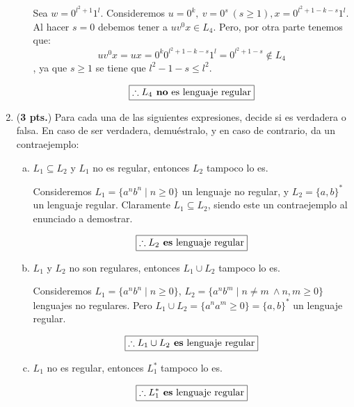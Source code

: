 \documentclass{article}
\begin{document}
\begin{enumerate}
\begin{enumerate}[a)]
          Sea $w = 0^{l^2 + 1}1^l$. Consideremos $u = 0^k,~ v = 0^s ~ (s \ge 1), x = 0^{l^2+1 - k - s}1^l$. Al hacer $s = 0$ debemos tener a $uv^0x \in L_4$. Pero, por otra parte tenemos que:
          $$uv^0x = ux = 0^k0^{l^2 + 1 - k - s}1^l = 0^{l^2 + 1 - s} \notin L_4$$,
          ya que $s \ge 1$ se tiene que $l^2 - 1 - s \le l^2$.

          $$\boxed{\therefore L_4 \text{\textbf{ no} es lenguaje regular}}$$

      \end{enumerate}

    \item (\textbf{3 pts.}) Para cada una de las siguientes expresiones, decide si es verdadera o falsa. En caso de ser verdadera, demuéstralo, y en caso de contrario, da un contraejemplo:
      \begin{enumerate}[a)]
        \item $L_1 \subseteq L_2$ y $L_1$ no es regular, entonces $L_2$ tampoco lo es.

          Consideremos $L_1 = \{a^nb^n \mid n \ge 0\}$ un lenguaje no regular, y $L_2 = \{a,b\}^*$ un lenguaje regular. Claramente $L_1 \subseteq L_2$, siendo este un contraejemplo al enunciado a demostrar.
          
          $$\boxed{\therefore L_2 \text{\textbf{ es} lenguaje regular}}$$

        \item $L_1$ y $L_2$ no son regulares, entonces $L_1 \cup L_2$ tampoco lo es.

          Consideremos $L_1 = \{a^nb^n \mid n \ge 0\}$, $L_2 = \{a^nb^m \mid n \neq m\ \land n,m \ge 0 \}$ lenguajes no regulares. Pero $L_1 \cup L_2 = \{a^na^m \ge 0\} = \{a,b\}^*$ un lenguaje regular.

          $$\boxed{\therefore L_1 \cup L_2 \text{\textbf{ es} lenguaje regular}}$$

        \item $L_1$ no es regular, entonces $L_1^*$ tampoco lo es.
          

          $$\boxed{\therefore L_1^* \text{\textbf{ es} lenguaje regular}}$$


\end{enumerate}
\end{enumerate}
\end{document}

